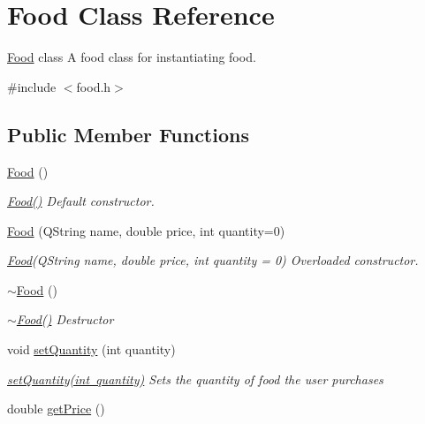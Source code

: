 \hypertarget{class_food}{}\section{Food Class Reference}
\label{class_food}


\mbox{\hyperlink{class_food}{Food}} class A food class for instantiating food.  




{\ttfamily \#include $<$food.\+h$>$}

\subsection*{Public Member Functions}
\begin{DoxyCompactItemize}
\item 
\mbox{\hyperlink{class_food_a75d4d7f76fd495cc8133302ca9fdc485}{Food}} ()
\begin{DoxyCompactList}\small\item\em \mbox{\hyperlink{class_food_a75d4d7f76fd495cc8133302ca9fdc485}{Food()}} Default constructor. \end{DoxyCompactList}\item 
\mbox{\hyperlink{class_food_aa479389d71859831d48d21bae7fa5217}{Food}} (Q\+String name, double price, int quantity=0)
\begin{DoxyCompactList}\small\item\em \mbox{\hyperlink{class_food}{Food}}(Q\+String name, double price, int quantity = 0) Overloaded constructor. \end{DoxyCompactList}\item 
\mbox{\hyperlink{class_food_a6f25dffd1fb347c982a53b9a384c611a}{$\sim$\+Food}} ()
\begin{DoxyCompactList}\small\item\em \mbox{\hyperlink{class_food_a6f25dffd1fb347c982a53b9a384c611a}{$\sim$\+Food()}} Destructor \end{DoxyCompactList}\item 
void \mbox{\hyperlink{class_food_aa29cc2869e2607983876962343c12809}{set\+Quantity}} (int quantity)
\begin{DoxyCompactList}\small\item\em \mbox{\hyperlink{class_food_aa29cc2869e2607983876962343c12809}{set\+Quantity(int quantity)}} Sets the quantity of food the user purchases \end{DoxyCompactList}\item 
double \mbox{\hyperlink{class_food_a16683d009125620dd07432fbe7711597}{get\+Price}} ()

\end{DoxyCompactItemize}
